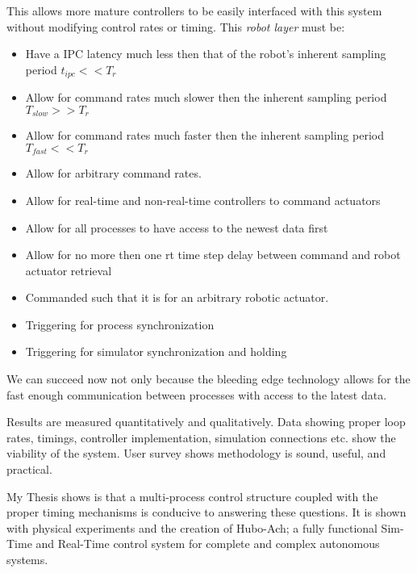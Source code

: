 This allows more mature controllers to be easily interfaced with this system without modifying control rates or timing.
This \textit{robot layer} must be:
\begin{itemize}
\item Have a IPC latency much less then that of the robot's inherent sampling period $t_{ipc}<<T_{r}$
\item Allow for command rates much slower then the inherent sampling period $T_{slow}>>T_{r}$
\item Allow for command rates much faster then the inherent sampling period $T_{fast}<<T_{r}$
\item Allow for arbitrary command rates.
\item Allow for real-time and non-real-time controllers to command actuators
\item Allow for all processes to have access to the newest data first
\item Allow for no more then one rt time step delay between command and robot actuator retrieval
\item Commanded such that it is for an arbitrary robotic actuator.
\item Triggering for process synchronization
\item Triggering for simulator synchronization and holding
\end{itemize}
We can succeed now not only because the bleeding edge technology allows for the fast enough communication between processes with access to the latest data.

Results are measured quantitatively and qualitatively.
Data showing proper loop rates, timings, controller implementation, simulation connections etc. show the viability of the system.
User survey shows methodology is sound, useful, and practical.





My Thesis shows is that a multi-process control structure coupled with the proper timing mechanisms is conducive to answering these questions.
It is shown with physical experiments and the creation of Hubo-Ach\cite{lofaroRAM2013}; a fully functional Sim-Time and Real-Time control system for complete and complex autonomous systems.

